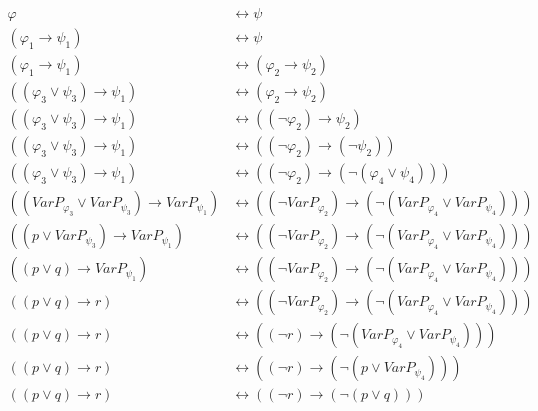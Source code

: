 \documentclass[a4paper]{article}
\begin{document}
\begin{align*}
    \varphi &\leftrightarrow \psi \\
    \left(\varphi_{1} \rightarrow \psi_{1} \right) &\leftrightarrow \psi \\
    \left(\varphi_{1} \rightarrow \psi_{1} \right) &\leftrightarrow \left(\varphi_{2} \rightarrow \psi_{2} \right) \\
    \left(\left(\varphi_{3} \lor \psi_{3} \right) \rightarrow \psi_{1} \right) &\leftrightarrow \left(\varphi_{2} \rightarrow \psi_{2} \right) \\
    \left(\left(\varphi_{3} \lor \psi_{3} \right) \rightarrow \psi_{1} \right) &\leftrightarrow \left(\left(\neg \varphi_{2}\right) \rightarrow \psi_{2} \right) \\
    \left(\left(\varphi_{3} \lor \psi_{3} \right) \rightarrow \psi_{1} \right) &\leftrightarrow \left(\left(\neg \varphi_{2}\right) \rightarrow \left(\neg \psi_{2}\right) \right) \\
    \left(\left(\varphi_{3} \lor \psi_{3} \right) \rightarrow \psi_{1} \right) &\leftrightarrow \left(\left(\neg \varphi_{2}\right) \rightarrow \left(\neg \left(\varphi_{4} \lor \psi_{4}\right)\right) \right) \\
    \left(\left(VarP_{\varphi_{3}} \lor VarP_{\psi_{3}} \right) \rightarrow VarP_{\psi_{1}} \right) &\leftrightarrow \left(\left(\neg VarP_{\varphi_{2}}\right) \rightarrow \left(\neg \left(VarP_{\varphi_{4}} \lor VarP_{\psi_{4}}\right)\right) \right) \\
    \left(\left(p \lor VarP_{\psi_{3}} \right) \rightarrow VarP_{\psi_{1}} \right) &\leftrightarrow \left(\left(\neg VarP_{\varphi_{2}}\right) \rightarrow \left(\neg \left(VarP_{\varphi_{4}} \lor VarP_{\psi_{4}}\right)\right) \right) \\
    \left(\left(p \lor q \right) \rightarrow VarP_{\psi_{1}} \right) &\leftrightarrow \left(\left(\neg VarP_{\varphi_{2}}\right) \rightarrow \left(\neg \left(VarP_{\varphi_{4}} \lor VarP_{\psi_{4}}\right)\right) \right) \\
    \left(\left(p \lor q \right) \rightarrow r \right) &\leftrightarrow \left(\left(\neg VarP_{\varphi_{2}}\right) \rightarrow \left(\neg \left(VarP_{\varphi_{4}} \lor VarP_{\psi_{4}}\right)\right) \right) \\
    \left(\left(p \lor q \right) \rightarrow r \right) &\leftrightarrow \left(\left(\neg r\right) \rightarrow \left(\neg \left(VarP_{\varphi_{4}} \lor VarP_{\psi_{4}}\right)\right) \right) \\
    \left(\left(p \lor q \right) \rightarrow r \right) &\leftrightarrow \left(\left(\neg r\right) \rightarrow \left(\neg \left(p \lor VarP_{\psi_{4}}\right)\right) \right) \\
    \left(\left(p \lor q \right) \rightarrow r \right) &\leftrightarrow \left(\left(\neg r\right) \rightarrow \left(\neg \left(p \lor q\right)\right) \right)
\end{align*}
\end{document}
